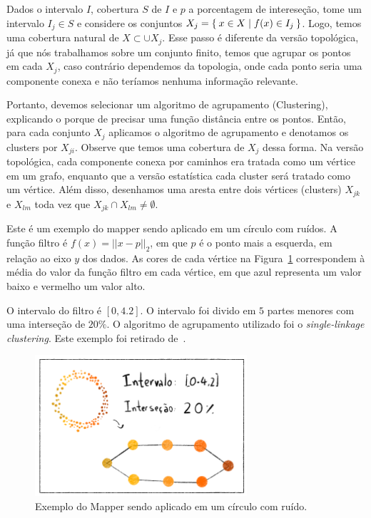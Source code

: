Dados o intervalo $I$, cobertura $S$ de $I$ e $p$ a porcentagem de intereseção, tome um
intervalo $I_j \in S$ e considere os conjuntos $X_j = \Set{x \in X | f(x) \in I_j}$.
Logo, temos uma cobertura natural de $X \subset \cup X_j$. Esse passo é diferente da 
versão topológica, já que nós trabalhamos sobre um conjunto finito, temos que agrupar os pontos
em cada $X_j$, caso contrário dependemos da topologia, onde cada ponto seria uma componente conexa
e não teríamos nenhuma informação relevante. 

Portanto, devemos selecionar um algoritmo de agrupamento (Clustering), explicando o 
porque de precisar uma função distância entre os pontos. Então, para cada conjunto $X_j$ aplicamos 
o algoritmo de agrupamento e denotamos os clusters por $X_{ji}$. Observe que temos uma cobertura
de $X_j$ dessa forma. Na versão topológica, cada componente conexa por caminhos era tratada como
um vértice em um grafo, enquanto que a versão estatística cada cluster será tratado como
um vértice. Além disso, desenhamos uma aresta entre dois vértices (clusters) $X_{jk}$ e 
$X_{lm}$ toda vez que $X_{jk} \cap X_{lm} \neq \emptyset$.

\begin{ex}
    Este é um exemplo do mapper sendo aplicado em um círculo com ruídos. A função filtro
    é $f(x) = || x - p ||_2$, em que $p$ é o ponto mais a esquerda, em relação ao eixo $y$
    dos dados. As cores de cada vértice na Figura~\ref{fig:statmap} correspondem à média
    do valor da função filtro em cada vértice, em que azul representa um valor baixo e 
    vermelho um valor alto. 

    O intervalo do filtro é $[0,4.2]$. O intervalo foi divido em $5$ partes menores com uma
    interseção de $20\%$. O algoritmo de agrupamento utilizado foi o \textit{single-linkage
    clustering}. Este exemplo foi retirado de~\cite{mapper}. 
    \begin{figure}
        \centering
        \includegraphics[width=0.7\textwidth]{images/statmap.png}
        \caption{Exemplo do Mapper sendo aplicado em um círculo com ruído.}
        \label{fig:statmap}
        \fautor
    \end{figure}
\end{ex} 

